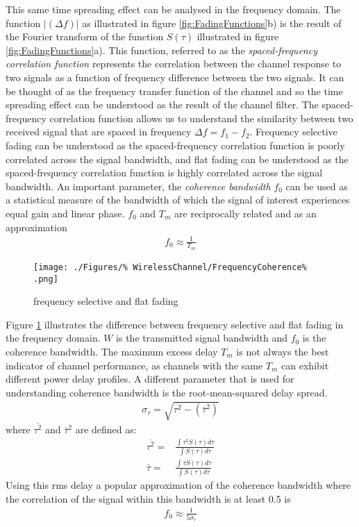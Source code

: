 This same time spreading effect can be analysed in %
the frequency domain. The function $\lvert (\Delta f) %
\rvert$ as illustrated in figure \ref{fig:FadingFunctions}b) %
is the result of the Fourier transform of the function %
$S(\tau)$ illustrated in figure \ref{fig:FadingFunctions}a). %
This function, %
referred to as the \emph{spaced-frequency correlation %
function} represents the correlation between the channel %
response to two signals as a function of frequency %
difference between the two signals. It can be thought of %
as the frequency transfer function of the channel and so %
the time spreading effect can be understood as the result %
of the channel filter.
\FloatBarrier
The spaced-frequency correlation function allows us to %
understand the similarity between two received signal %
that are spaced in frequency $\Delta f = f_{1} - f_{2}$. %
Frequency selective fading can be understood as the %
spaced-frequency correlation function is poorly correlated %
across the signal bandwidth, and flat fading can be understood %
as the spaced-frequency correlation function is highly %
correlated across the signal bandwidth. An important %
parameter, the \emph{coherence bandwidth} $f_{0}$ %
can be used as a statistical measure of the bandwidth %
of which the signal of interest experiences equal gain %
and linear phase. $f_{0}$ and $T_{m}$ are reciprocally %
related and as an approximation
\begin{align}
	f_{0} \approx \frac{1}{T_{m}}
\end{align}
\begin{figure}[ht]
	\texttt{[image: ./Figures/\%
		WirelessChannel/FrequencyCoherence\%
		.png]}
	\caption{frequency selective and flat fading %
	}
	\label{fig:FadingFigure}
\end{figure}
Figure \ref{fig:FadingFigure} illustrates the difference %
between frequency selective and flat fading in the %
frequency domain. $W$ is the transmitted signal %
bandwidth and $f_{0}$ is the coherence bandwidth.
\FloatBarrier
The maximum excess delay $T_{m}$ is not always the %
best indicator of channel performance, as channels with %
the same $T_{m}$ can exhibit different power delay profiles. %
A different parameter that is used for understanding %
coherence bandwidth is the root-mean-squared delay spread.
\begin{align}
	\sigma_{\tau} = \sqrt{\overline{\tau^{2}} - (\bar{\tau}^{2})}
\end{align}
where $\overline{\tau^{2}}$ and $\bar{\tau}^{2}$ are defined %
as:
\begin{align}
	\overline{\tau^{2}} =&  
	\frac{\int \tau^{2} S(\tau) d\tau}{\int S(\tau) d\tau}
	\\[1.0em]
	\bar{\tau} =& \frac{\int \tau S(\tau) d\tau}{\int S(\tau) 
	d\tau}
\end{align}
Using this rms delay a popular approximation of %
the coherence bandwidth where the correlation %
of the signal within this bandwidth is at least 0.5 is
\begin{align}
	f_{0} \approx \frac{1}{5\sigma_{\tau}}
\end{align}
